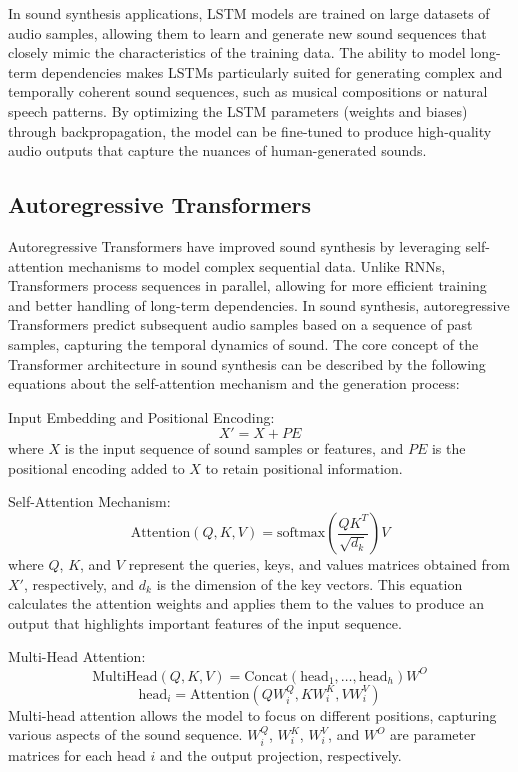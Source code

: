 \documentclass[11pt,a4paper,oneside]{report}
\begin{document}
In sound synthesis applications, LSTM models are trained on large datasets of audio samples, allowing them to learn and generate new sound sequences that closely mimic the characteristics of the training data. The ability to model long-term dependencies makes LSTMs particularly suited for generating complex and temporally coherent sound sequences, such as musical compositions or natural speech patterns. By optimizing the LSTM parameters (weights and biases) through backpropagation, the model can be fine-tuned to produce high-quality audio outputs that capture the nuances of human-generated sounds.

\subsection{Autoregressive Transformers}

Autoregressive Transformers \cite{yan2021videogpt, wu2022nuwa} have improved sound synthesis by leveraging self-attention mechanisms to model complex sequential data. Unlike RNNs, Transformers process sequences in parallel, allowing for more efficient training and better handling of long-term dependencies. 
In sound synthesis, autoregressive Transformers predict subsequent audio samples based on a sequence of past samples, capturing the temporal dynamics of sound.
The core concept of the Transformer architecture in sound synthesis can be described by the following equations about the self-attention mechanism and the generation process:

Input Embedding and Positional Encoding:
\begin{equation}
X' = X + PE
\end{equation}
where $X$ is the input sequence of sound samples or features, and $PE$ is the positional encoding added to $X$ to retain positional information.

Self-Attention Mechanism:
\begin{equation}
\text{Attention}(Q, K, V) = \text{softmax}\left(\frac{QK^T}{\sqrt{d_k}}\right)V
\end{equation}
where $Q$, $K$, and $V$ represent the queries, keys, and values matrices obtained from $X'$, respectively, and $d_k$ is the dimension of the key vectors. This equation calculates the attention weights and applies them to the values to produce an output that highlights important features of the input sequence.

Multi-Head Attention:
\begin{equation}
\text{MultiHead}(Q, K, V) = \text{Concat}(\text{head}_1, \ldots, \text{head}_h)W^O
\end{equation}
\begin{equation}
\text{head}_i = \text{Attention}(QW^Q_i, KW^K_i, VW^V_i)
\end{equation}
Multi-head attention allows the model to focus on different positions, capturing various aspects of the sound sequence. $W^Q_i$, $W^K_i$, $W^V_i$, and $W^O$ are parameter matrices for each head $i$ and the output projection, respectively.
\end{document}
